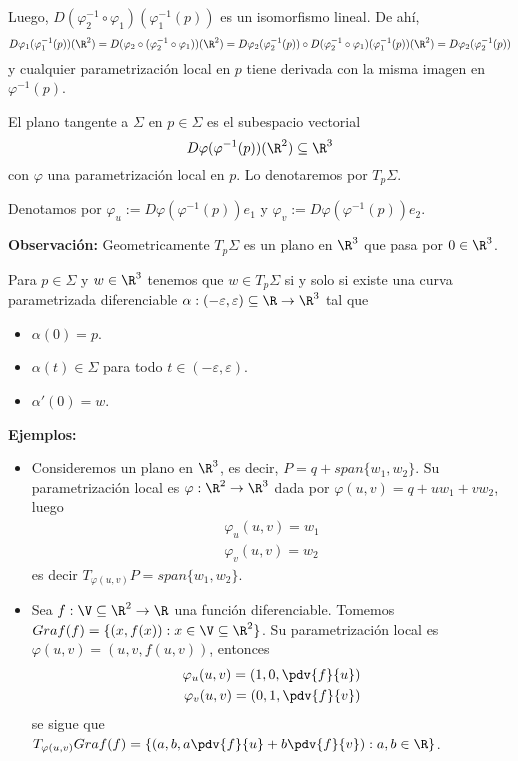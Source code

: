 \documentclass{article}
\begin{document}
\noindent Luego, $D(\varphi_{2}^{-1}\circ\varphi_{1})(\varphi_{1}^{-1}(p))$ es un isomorfismo 
lineal. De ahí,
\begin{equation*}
    D\varphi_{1}(\varphi_{1}^{-1}(p))(\R^{2})=D(\varphi_{2}\circ(\varphi_{2}^{-1}\circ
    \varphi_{1}))(\R^{2})=D\varphi_{2}(\varphi_{2}^{-1}(p))\circ D(\varphi_{2}^{-1}\circ
    \varphi_{1})(\varphi_{1}^{-1}(p))(\R^{2})=D\varphi_{2}(\varphi_{2}^{-1}(p))
\end{equation*}
y cualquier parametrización local en $p$ tiene derivada con la misma imagen en $\varphi^{-1}(p)$.
\begin{dfn}
    El plano tangente a $\Sigma$ en $p\in\Sigma$ es el subespacio vectorial
    \begin{equation*}
        D\varphi(\varphi^{-1}(p))(\R^{2})\subseteq\R^{3}
    \end{equation*}
    con $\varphi$ una parametrización local en $p$. Lo denotaremos por $T_{p}\Sigma$.
\end{dfn}
\noindent Denotamos por $\varphi_{u}:=D\varphi(\varphi^{-1}(p))e_{1}$ y $\varphi_{v}:=
D\varphi(\varphi^{-1}(p))e_{2}$.
\vspace{4mm}

\noindent\textbf{Observación:} Geometricamente $T_{p}\Sigma$ es un plano en $\R^{3}$ que pasa por 
$0\in\R^{3}$.
\begin{prop}
    Para $p\in\Sigma$ y $w\in\R^{3}$ tenemos que $w\in T_{p}\Sigma$ si y solo si existe una curva
    parametrizada diferenciable $\alpha:(-\varepsilon,\varepsilon)\subseteq\R\to\R^{3}$ tal que
    \begin{itemize}
        \item $\alpha(0)=p$.
        \item $\alpha(t)\in\Sigma$ para todo $t\in(-\varepsilon,\varepsilon)$.
        \item $\alpha'(0)=w$.
    \end{itemize}
\end{prop}

\noindent\textbf{Ejemplos:}
\begin{itemize}
    \item Consideremos un plano en $\R^{3}$, es decir, $P=q+span\{w_{1},w_{2}\}$. Su 
    parametrización local es $\varphi:\R^{2}\to\R^{3}$ dada por $\varphi(u,v)=q+uw_{1}+vw_{2}$, 
    luego
    \begin{align*}
        \varphi_{u}(u,v)=w_{1} \\
        \varphi_{v}(u,v)=w_{2}
    \end{align*}
    es decir $T_{\varphi(u,v)}P=span\{w_{1},w_{2}\}$.

    \item Sea $f:\V\subseteq\R^{2}\to\R$ una función diferenciable. Tomemos $Graf(f)=
    \{(x,f(x)):x\in\V\subseteq\R^{2}\}$. Su parametrización local es $\varphi(u,v)=(u,v,f(u,v))$,
    entonces
    \begin{align*}
        \varphi_{u}(u,v)=\left(1,0,\pdv{f}{u}\right) \\
        \varphi_{v}(u,v)=\left(0,1,\pdv{f}{v}\right)
    \end{align*}
    se sigue que $T_{\varphi(u,v)}Graf(f)=\left\{(a,b,a\pdv{f}{u}+b\pdv{f}{v}):a,b\in\R\right\}$.
\end{itemize}
\end{document}
